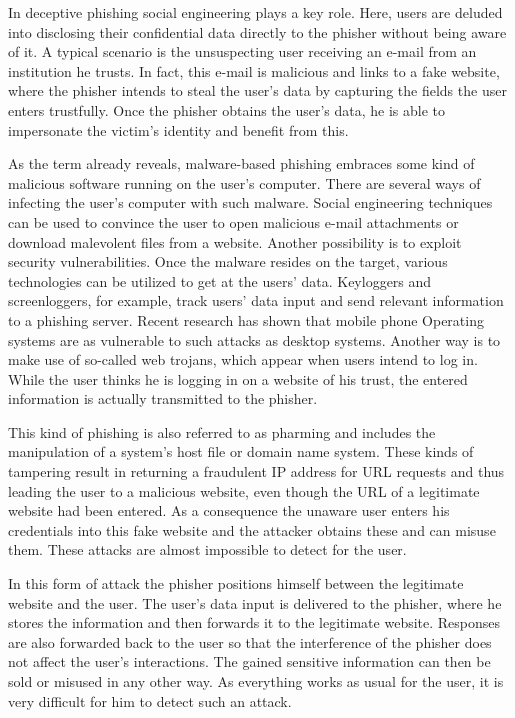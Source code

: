 \begin{description}[leftmargin=0cm]
	\item[Deceptive Phishing] In deceptive phishing social engineering plays a key role.
 Here, users are deluded into disclosing their confidential data directly to the phisher without being aware of it.
 A typical scenario is the unsuspecting user receiving an e-mail from an institution he trusts.
 In fact, this e-mail is malicious and links to a fake website, where the phisher intends to steal the user's data by capturing the fields the user enters trustfully.
 Once the phisher obtains the user's data, he is able to impersonate the victim's identity and benefit from this.

	\item[Malware-Based Phishing] As the term already reveals, malware-based phishing embraces some kind of malicious software running on the user's computer.
 There are several ways of infecting the user's computer with such malware.
 Social engineering techniques can be used to convince the user to open malicious e-mail attachments or download malevolent files from a website.
 Another possibility is to exploit security vulnerabilities.
 Once the malware resides on the target, various technologies can be utilized to get at the users' data.
 Keyloggers and screenloggers, for example, track users' data input and send relevant information to a phishing server.
 Recent research has shown that mobile phone Operating systems are as vulnerable to such attacks as desktop systems.
 Another way is to make use of so-called web trojans, which appear when users intend to log in.
 While the user thinks he is logging in on a website of his trust, the entered information is actually transmitted to the phisher.

	\item[DNS Hijacking] This kind of phishing is also referred to as pharming and includes the manipulation of a system's host file or domain name system.
 These kinds of tampering result in returning a fraudulent IP address for URL requests and thus leading the user to a malicious website, even though the URL of a legitimate website had been entered.
 As a consequence the unaware user enters his credentials into this fake website and the attacker obtains these and can misuse them.
 These attacks are almost impossible to detect for the user.

	\item[Man-in-the-Middle Attack] In this form of attack the phisher positions himself between the legitimate website and the user.
 The user's data input is delivered to the phisher, where he stores the information and then forwards it to the legitimate website.
 Responses are also forwarded back to the user so that the interference of the phisher does not affect the user's interactions.
 The gained sensitive information can then be sold or misused in any other way.
 As everything works as usual for the user, it is very difficult for him to detect such an attack.
 

\end{description}
